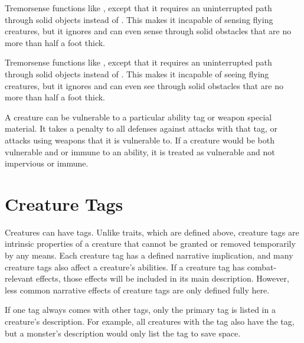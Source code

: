   Tremorsense functions like , except that it requires an uninterrupted path through solid objects instead of .
  This makes it incapable of sensing flying creatures, but it ignores  and can even sense through solid obstacles that are no more than half a foot thick.

  Tremorsense functions like , except that it requires an uninterrupted path through solid objects instead of .
  This makes it incapable of seeing flying creatures, but it ignores  and can even see through solid obstacles that are no more than half a foot thick.

  A creature can be vulnerable to a particular ability tag or weapon special material.
  It takes a  penalty to all defenses against attacks with that tag, or attacks using weapons that it is vulnerable to.
  If a creature would be both vulnerable and \impervious or immune to an ability, it is treated as vulnerable and not impervious or immune.

\newpage
\section{Creature Tags}\label{Creature Tags}

  Creatures can have tags.
  Unlike traits, which are defined above, creature tags are intrinsic properties of a creature that cannot be granted or removed temporarily by any means.
  Each creature tag has a defined narrative implication, and many creature tags also affect a creature's abilities.
  If a creature tag has combat-relevant effects, those effects will be included in its main description.
  However, less common narrative effects of creature tags are only defined fully here.

  If one tag always comes with other tags, only the primary tag is listed in a creature's description.
  For example, all creatures with the  tag also have the  tag, but a monster's description would only list the  tag to save space.

